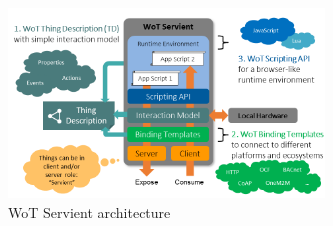 \begin{figure}[!t]
\centering
\includegraphics[width=3.3in]{figures/wot-servient.png}
\caption{WoT Servient architecture}
\label{fig-fservient}
\end{figure}


